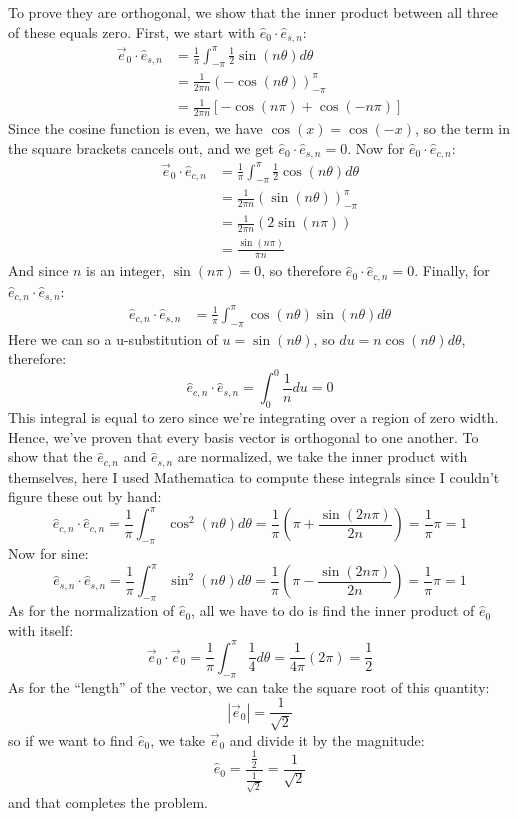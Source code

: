 \documentclass{article}
\begin{document}
\begin{solution}
	To prove they are orthogonal, we show that the inner product between all three of these equals zero. First,
	we start with $\hat{e}_0 \cdot \hat{e}_{s, n}$: 
	\begin{align*}
		\vec{e}_0 \cdot \hat{e}_{s, n} &= \frac{1}{\pi}\int_{-\pi}^\pi \frac{1}{2}\sin(n \theta) d\theta  \\
									   &= \frac{1}{2\pi n}\left( -\cos(n \theta) \right)_{-\pi}^\pi \\
									   &= \frac{1}{2\pi n}\left[-\cos(n \pi) + \cos(-n\pi)\right] 
	\end{align*}
	Since the cosine function is even, we have $\cos(x) = \cos(-x)$, so the term in the square brackets cancels
	out, and we get $\hat{e}_0 \cdot \hat{e}_{s, n} = 0$. Now for $\hat{e}_0 \cdot \hat{e}_{c, n}$:
	\begin{align*}
		\vec{e}_0 \cdot \hat{e}_{c, n} &= \frac{1}{\pi}\int_{-\pi}^\pi \frac{1}{2}\cos(n \theta) d\theta \\
									   &= \frac{1}{2\pi n}(\sin (n \theta))_{-\pi}^\pi  \\
									   &= \frac{1}{2\pi n}(2 \sin(n \pi)) \\
									   &= \frac{\sin (n\pi)}{\pi n} 
	\end{align*}
	And since $n$ is an integer, $\sin(n\pi) = 0$, so therefore $\hat{e}_0 \cdot \hat{e}_{c, n} = 0$. Finally, 
	for $\hat{e}_{c, n} \cdot \hat{e}_{s, n}$:
	\begin{align*}
		\hat{e}_{c, n} \cdot \hat{e}_{s, n} &= \frac{1}{\pi} \int_{-\pi}^\pi \cos(n \theta) \sin(n \theta) d\theta
	\end{align*}
	Here we can so a u-substitution of $u = \sin(n \theta)$, so $du = n \cos(n \theta) d\theta$, therefore:
	\[
		\hat{e}_{c, n} \cdot \hat{e}_{s, n} = \int_{0}^{0} \frac{1}{n} du = 0
	\] 
	This integral is equal to zero since we're integrating over a region of zero width. Hence, we've proven that
	every basis vector is orthogonal to one another. To show that the $\hat{e}_{c,n}$ and $\hat{e}_{s, n}$ are
	normalized, we take the inner product with themselves, here I used Mathematica to compute these integrals
	since I couldn't figure these out by hand:
	\[
		\hat{e}_{c,n} \cdot \hat{e}_{c,n} = \frac{1}{\pi}\int_{-\pi}^\pi \cos^2(n \theta) d\theta = \frac{1}{\pi}\left( \pi + \frac{\sin(2n \pi)}{2n}\right) = \frac{1}{\pi} \pi = 1
	\] 
	Now for sine:
	\[
		\hat{e}_{s, n} \cdot \hat{e}_{s, n} = \frac{1}{\pi}\int_{-\pi}^\pi \sin^2(n \theta) d\theta = \frac{1}{\pi}\left( \pi - \frac{\sin(2 n \pi)}{2n} \right) = \frac{1}{\pi}\pi = 1
	\] 
	As for the normalization of $\hat{e}_0$, 
	all we have to do is find the inner product of $\hat{e}_0$ with itself:
	\[
		\vec{e}_0 \cdot \vec{e}_0 = \frac{1}{\pi}\int_{-\pi}^\pi \frac{1}{4}d \theta = \frac{1}{4\pi}(2\pi) = \frac{1}{2}
	\] 
	As for the ``length'' of the vector, we can take the square root of this quantity:
	\[
	|\vec{e}_0| = \frac{1}{\sqrt{2} } 
	\] 
	so if we want to find $\hat{e}_0$, we take $\vec e_0$ and divide it by the magnitude:
	\[
	\hat{e}_0 = \frac{\frac{1}{2}}{\frac{1}{\sqrt{2} }} = \frac{1}{\sqrt{2} }  
	\] 
	and that completes the problem.
\end{solution}
\end{document}
